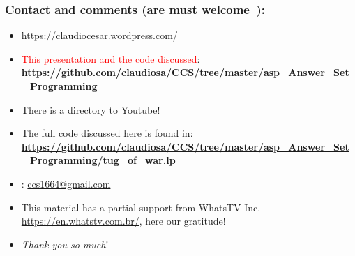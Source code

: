 \documentclass{beamer}
\begin{document}
\begin{frame}
\frametitle{Contact and comments (are must welcome\ \Smiley):}
  
\begin{block}{}
  \begin{itemize}
  \item \url{https://claudiocesar.wordpress.com/}
   \item \textcolor{red}{This presentation and the code discussed}:\\
   \textbf{\textcolor{blue}{\url{https://github.com/claudiosa/CCS/tree/master/asp_Answer_Set_Programming}}}
   \item There is a directory to Youtube!
   \item  The full code discussed here is found in:\\ \textbf{\textcolor{blue}{\url{https://github.com/claudiosa/CCS/tree/master/asp_Answer_Set_Programming/tug_of_war.lp}}}
    
  \item \Letter: \url{ccs1664@gmail.com}
  \item This material has a partial support from WhatsTV Inc. \url{https://en.whatstv.com.br/}, here our gratitude!
  \item \textit{Thank you so much}!

  \end{itemize}
  \end{block}

\end{frame}


\end{document}
